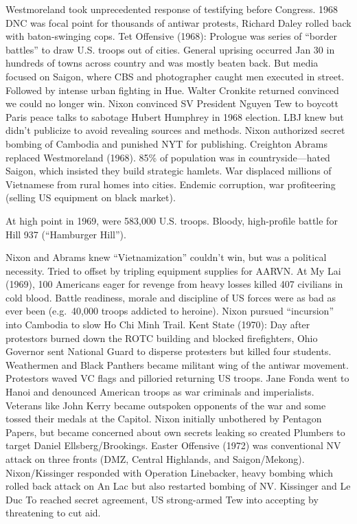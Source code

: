 \documentclass[
]{article}
\begin{document}
Westmoreland took unprecedented response of testifying before Congress.
1968 DNC was focal point for thousands of antiwar protests, Richard
Daley rolled back with baton-swinging cops. Tet Offensive (1968):
Prologue was series of ``border battles'' to draw U.S. troops out of
cities. General uprising occurred Jan 30 in hundreds of towns across
country and was mostly beaten back. But media focused on Saigon, where
CBS and photographer caught men executed in street. Followed by intense
urban fighting in Hue. Walter Cronkite returned convinced we could no
longer win. Nixon convinced SV President Nguyen Tew to boycott Paris
peace talks to sabotage Hubert Humphrey in 1968 election. LBJ knew but
didn't publicize to avoid revealing sources and methods. Nixon
authorized secret bombing of Cambodia and punished NYT for publishing.
Creighton Abrams replaced Westmoreland (1968). 85\% of population was in
countryside---hated Saigon, which insisted they build strategic hamlets.
War displaced millions of Vietnamese from rural homes into cities.
Endemic corruption, war profiteering (selling US equipment on black
market).

At high point in 1969, were 583,000 U.S. troops. Bloody, high-profile
battle for Hill 937 (``Hamburger Hill'').

Nixon and Abrams knew ``Vietnamization'' couldn't win, but was a
political necessity. Tried to offset by tripling equipment supplies for
AARVN. At My Lai (1969), 100 Americans eager for revenge from heavy
losses killed 407 civilians in cold blood. Battle readiness, morale and
discipline of US forces were as bad as ever been (e.g.~40,000 troops
addicted to heroine). Nixon pursued ``incursion'' into Cambodia to slow
Ho Chi Minh Trail. Kent State (1970): Day after protestors burned down
the ROTC building and blocked firefighters, Ohio Governor sent National
Guard to disperse protesters but killed four students. Weathermen and
Black Panthers became militant wing of the antiwar movement. Protestors
waved VC flags and pilloried returning US troops. Jane Fonda went to
Hanoi and denounced American troops as war criminals and imperialists.
Veterans like John Kerry became outspoken opponents of the war and some
tossed their medals at the Capitol. Nixon initially unbothered by
Pentagon Papers, but became concerned about own secrets leaking so
created Plumbers to target Daniel Ellsberg/Brookings. Easter Offensive
(1972) was conventional NV attack on three fronts (DMZ, Central
Highlands, and Saigon/Mekong). Nixon/Kissinger responded with Operation
Linebacker, heavy bombing which rolled back attack on An Lac but also
restarted bombing of NV. Kissinger and Le Duc To reached secret
agreement, US strong-armed Tew into accepting by threatening to cut aid.
\end{document}
